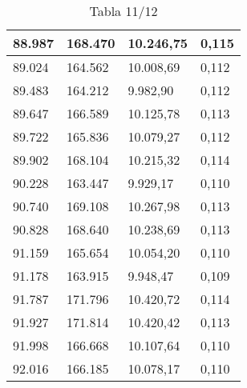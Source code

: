 \begin{table}[H]
{\begin{tabular}{| l | l | l |l |}
88.987	&	168.470	&	10.246,75	&	0,115	\\ \hline
89.024	&	164.562	&	10.008,69	&	0,112	\\ \hline
89.483	&	164.212	&	9.982,90	&	0,112	\\ \hline
89.647	&	166.589	&	10.125,78	&	0,113	\\ \hline
89.722	&	165.836	&	10.079,27	&	0,112	\\ \hline
89.902	&	168.104	&	10.215,32	&	0,114	\\ \hline
90.228	&	163.447	&	9.929,17	&	0,110	\\ \hline
90.740	&	169.108	&	10.267,98	&	0,113	\\ \hline
90.828	&	168.640	&	10.238,69	&	0,113	\\ \hline
91.159	&	165.654	&	10.054,20	&	0,110	\\ \hline
91.178	&	163.915	&	9.948,47	&	0,109	\\ \hline
91.787	&	171.796	&	10.420,72	&	0,114	\\ \hline
91.927	&	171.814	&	10.420,42	&	0,113	\\ \hline
91.998	&	166.668	&	10.107,64	&	0,110	\\ \hline
92.016	&	166.185	&	10.078,17	&	0,110	\\ \hline
  \end{tabular}
  \caption*{Tabla 11/12}
}
\end{table}
